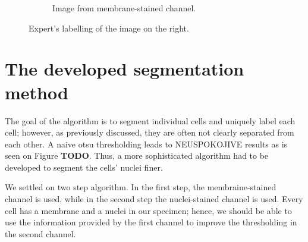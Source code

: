 \documentclass[
  digital,     %
  oneside,     %
  nosansbold,  %
  nocolorbold, %
  lof,         %
  lot,         %
]{fithesis4}
\begin{document}
\begin{figure}
\begin{subfigure}[t]{0.4\textwidth}
        \caption{Image from membrane-stained channel.}
        \label{fig:label_membrane_channel}
    \end{subfigure}
    \hfill
    \caption{Expert's labelling of the image on the right.}
    \label{fig:labelling_example}
\end{figure}


\chapter{The developed segmentation method}


The goal of the algorithm is to segment individual cells and uniquely label each
cell; however, as previously discussed, they are often not clearly separated
from each other. A naive otsu thresholding leads to NEUSPOKOJIVE results as is
seen on Figure \textbf{TODO}. Thus, a more sophisticated algorithm had to be
developed to segment the cells' nuclei finer.

We settled on two step algorithm. In the first step, the membraine-stained
channel is used, while in the second step the nuclei-stained channel is used.
Every cell has a membrane and a nuclei in our specimen; hence, we should be able
to use the information provided by the first channel to improve the thresholding
in the second channel.
\end{document}
